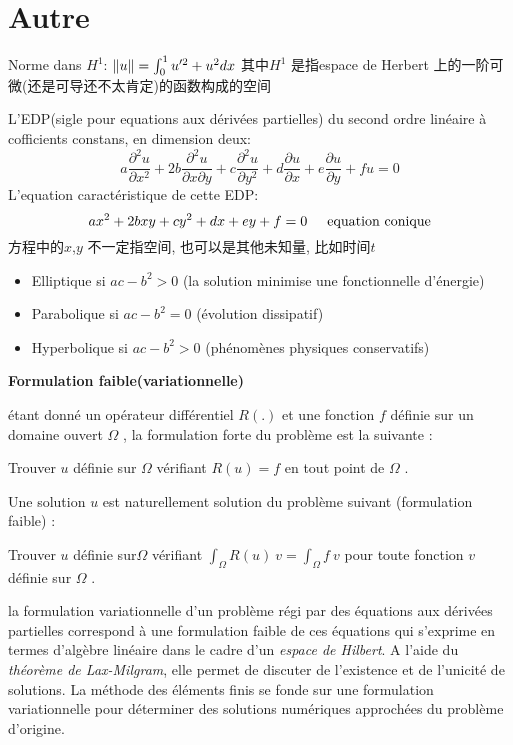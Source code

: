 \section{Autre}
Norme dans $H^1$: $\left\Vert u\right\Vert = \int_0^1 u'^2 + u^2 dx$\newline
其中$H^1$ 是指espace de Herbert 上的一阶可微(还是可导还不太肯定)的函数构成的空间


L'EDP(sigle pour equations aux d\'eriv\'ees partielles) du second ordre lin\'eaire \`a cofficients constans, en dimension deux:
\begin{equation}
		a \frac{\partial^2 u}{\partial x^2} +
		2b \frac{\partial^2 u}{\partial x \partial y} +
		c \frac{\partial^2 u}{\partial y^2} +
		d \frac{\partial u}{\partial x} +
		e \frac{\partial u}{\partial y} +
		fu
		=0
\end{equation}
L'equation caract\'eristique de cette EDP:
\begin{equation}
		ax^2 + 2bxy + cy^2 + dx + ey + f = 0 \hspace{0.5cm} \text{equation conique}
\end{equation}
方程中的$x$,$y$ 不一定指空间, 也可以是其他未知量, 比如时间$t$

\begin{itemize}
		\item Elliptique si $ac - b^2 > 0$ (la solution minimise une fonctionnelle d'\'energie)
		\item Parabolique si $ac - b^2 = 0$ (\'evolution dissipatif)
		\item Hyperbolique si $ac - b^2 > 0$ (ph\'enom\`enes physiques conservatifs)
\end{itemize}

\textbf{Formulation faible(variationnelle)}

\'etant donn\'e un op\'erateur diff\'erentiel $ \displaystyle R(.) $ et une fonction $ \displaystyle f $ d\'efinie sur un domaine ouvert $ \Omega$ , la formulation forte du probl\`eme est la suivante :

Trouver $\displaystyle u$ d\'efinie sur $ \Omega$  v\'erifiant $ \displaystyle R(u)=f $ en tout point de $ \Omega$ .

Une solution $ \displaystyle u$  est naturellement solution du probl\`eme suivant (formulation faible) :

Trouver $ \displaystyle u$  d\'efinie sur$  \Omega $ v\'erifiant $ \int_\Omega R(u)\ v = \int_\Omega f\ v $ pour toute fonction $ \displaystyle v$  d\'efinie sur $ \Omega$ .

la formulation variationnelle d'un probl\`eme r\'egi par des \'equations aux d\'eriv\'ees partielles correspond \`a une formulation faible de ces \'equations qui s'exprime en termes d'alg\`ebre lin\'eaire dans le cadre d'un \emph{espace de Hilbert}. A l'aide du \emph{th\'eor\`eme de Lax-Milgram}, elle permet de discuter de l'existence et de l'unicit\'e de solutions. La m\'ethode des \'el\'ements finis se fonde sur une formulation variationnelle pour d\'eterminer des solutions num\'eriques approch\'ees du probl\`eme d'origine.

